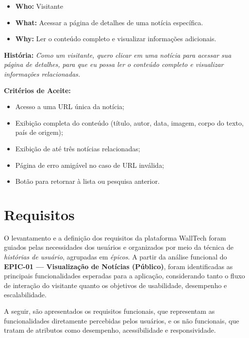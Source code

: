 \begin{itemize}
  \item \textbf{Who:} Visitante
  \item \textbf{What:} Acessar a página de detalhes de uma notícia específica.
  \item \textbf{Why:} Ler o conteúdo completo e visualizar informações adicionais.
\end{itemize}

\noindent \textbf{História:} \textit{Como um visitante, quero clicar em uma notícia para acessar sua página de detalhes, para que eu possa ler o conteúdo completo e visualizar informações relacionadas.}

\noindent \textbf{Critérios de Aceite:}
\begin{itemize}
  \item Acesso a uma URL única da notícia;
  \item Exibição completa do conteúdo (título, autor, data, imagem, corpo do texto, país de origem);
  \item Exibição de até três notícias relacionadas;
  \item Página de erro amigável no caso de URL inválida;
  \item Botão para retornar à lista ou pesquisa anterior.
\end{itemize}









\section{Requisitos}
\label{section:requisitos}

O levantamento e a definição dos requisitos da plataforma WallTech foram guiados pelas necessidades dos usuários e organizados por meio da técnica de \textit{histórias de usuário}, agrupadas em \textit{épicos}. A partir da análise funcional do \textbf{EPIC-01 — Visualização de Notícias (Público)}, foram identificadas as principais funcionalidades esperadas para a aplicação, considerando tanto o fluxo de interação do visitante quanto os objetivos de usabilidade, desempenho e escalabilidade.

A seguir, são apresentados os requisitos funcionais, que representam as funcionalidades diretamente percebidas pelos usuários, e os não funcionais, que tratam de atributos como desempenho, acessibilidade e responsividade.


